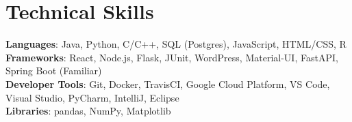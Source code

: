 \documentclass[letterpaper,11pt]{article}
\begin{document}
\section{Technical Skills}
\begin{itemize}[leftmargin=0.15in, label={}]
\small{\item{\textbf{Languages}{: Java, Python, C/C++, SQL (Postgres), JavaScript, HTML/CSS, R} \\
\textbf{Frameworks}{: React, Node.js, Flask, JUnit, WordPress, Material-UI, FastAPI, Spring Boot (Familiar)} \\
\textbf{Developer Tools}{: Git, Docker, TravisCI, Google Cloud Platform, VS Code, Visual Studio, PyCharm, IntelliJ, Eclipse} \\
\textbf{Libraries}{: pandas, NumPy, Matplotlib}}}
\end{itemize}


\end{document}
